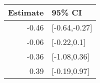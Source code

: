 \begin{tabular}{rl}
  \hline
Estimate & 95\% CI \\ 
  \hline
-0.46 & [-0.64,-0.27] \\ 
  -0.06 & [-0.22,0.1] \\ 
  -0.36 & [-1.08,0.36] \\ 
  0.39 & [-0.19,0.97] \\ 
   \hline
\end{tabular}

